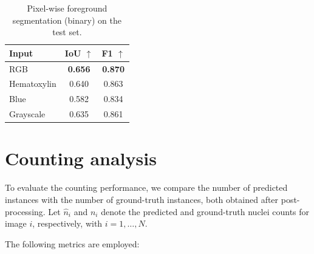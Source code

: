 \documentclass[target=bach,aauheader=,style=]{thud}
\begin{document}
\begin{table}[ht]
\centering
\caption{Pixel-wise foreground segmentation (binary) on the test set.}
\label{tab:pix-binary}
\small
\begin{tabular}{lcc}
\toprule
\textbf{Input} & \textbf{IoU} $\uparrow$ & \textbf{F1} $\uparrow$ \\
\midrule
RGB         & \textbf{0.656} & \textbf{0.870} \\
Hematoxylin & 0.640 & 0.863 \\
Blue        & 0.582 & 0.834 \\
Grayscale   & 0.635 & 0.861 \\
\bottomrule
\end{tabular}
\end{table}

\section{Counting analysis}
\label{sec:counting-analysis}
To evaluate the counting performance, we compare the number of predicted instances with the number of ground-truth instances, both obtained after post-processing. 
Let $\hat{n}_i$ and $n_i$ denote the predicted and ground-truth nuclei counts for image $i$, respectively, with $i=1,\dots,N$.

The following metrics are employed:
\end{document}
